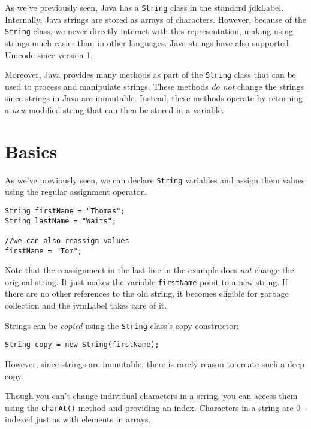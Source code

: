

As we've previously seen, Java has a \texttt{String} 
class in the standard \gls{jdkLabel}.  Internally, Java 
strings are stored as arrays of characters.  However, because
of the \texttt{String} class, we never directly 
interact with this representation, making using strings
much easier than in other languages.  Java strings have
also supported \gls{Unicode} since version 1.

Moreover, Java provides many methods as part of the 
\texttt{String} class that can be used to process
and manipulate strings.  These methods \emph{do not} change
the strings since strings in Java are \gls{immutable}.  
Instead, these methods operate by returning a \emph{new}
modified string that can then be stored in a variable.

\section{Basics}

As we've previously seen, we can declare \texttt{String}
variables and assign them values using the regular
assignment operator.

\begin{verbatim}
String firstName = "Thomas";
String lastName = "Waits";

//we can also reassign values
firstName = "Tom";
\end{verbatim}

Note that the reassignment in the last line in the example
does \emph{not} change the original string.  It just makes
the variable \texttt{firstName} point to a new
string.  If there are no other references to the old string,
it becomes eligible for garbage collection and the \gls{jvmLabel}
takes care of it.

Strings can be \emph{copied} using the \texttt{String}
class's copy constructor: 

\texttt{String copy = new String(firstName);}

However, since strings are immutable, there is rarely reason
to create such a \gls{deep copy}.

Though you can't change individual characters in a string, 
you can access them using the \texttt{charAt()}
method and providing an index.  Characters in a string are
0-indexed just as with elements in arrays. 

